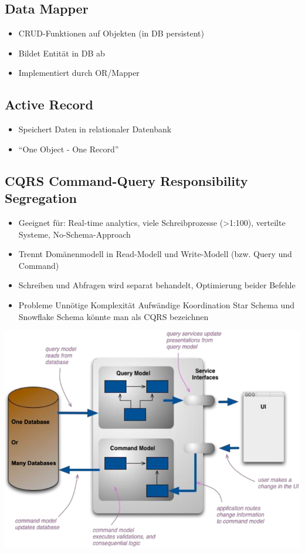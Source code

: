 \documentclass[a4paper, landscape, 8pt]{scrartcl}
\begin{document}
\begin{multicols*}{4}
        \subsection{Data Mapper}
        \begin{itemize}
            \item CRUD-Funktionen auf Objekten (in DB persistent)
            \item Bildet Entität in DB ab
            \item Implementiert durch OR/Mapper
        \end{itemize}

        \subsection{Active Record}
        \begin{itemize}
            \item Speichert Daten in relationaler Datenbank
            \item \enquote{One Object - One Record}
        \end{itemize}

        \subsection{CQRS {\tiny Command-Query Responsibility Segregation}}
        \begin{itemize}
            \item Geeignet für: Real-time analytics, viele Schreibprozesse (>1:100), verteilte Systeme, No-Schema-Approach
            \item Trennt Domänenmodell in Read-Modell und Write-Modell (bzw. Query und Command)
            \item Schreiben und Abfragen wird separat behandelt, Optimierung beider Befehle
            \item Probleme
            \subitem Unnötige Komplexität
            \subitem Aufwändige Koordination
            \subitem Star Schema und Snowflake Schema könnte man als CQRS bezeichnen
        \end{itemize}
        \includegraphics[width=0.7\columnwidth]{graphic/11-cqrs-modell}


\end{multicols*}
\end{document}
